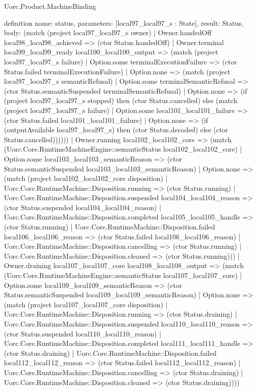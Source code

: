 \begin{lexlean}{Uorc.Product.MachineBinding}
\begin{semanticmodule}
definition{
  name: status,
  parameters: [local97_local97_s : State],
  result: Status,
  body: (match (project local97_local97_s owner)
    | Owner.handedOff local98_local98_achieved => (ctor Status.handedOff)
    | Owner.terminal local99_local99_ready local100_local100_output => (match (project local97_local97_s failure)
      | Option.some terminalExecutionFailure => (ctor Status.failed terminalExecutionFailure)
      | Option.none => (match (project local97_local97_s semanticRefusal)
        | Option.some terminalSemanticRefusal => (ctor Status.semanticSuspended terminalSemanticRefusal)
        | Option.none => (if (project local97_local97_s stopped) then (ctor Status.cancelled) else (match (project local97_local97_s failure)
          | Option.some local101_local101_failure => (ctor Status.failed local101_local101_failure)
          | Option.none => (if (outputAvailable local97_local97_s) then (ctor Status.decoded) else (ctor Status.cancelled))))))
    | Owner.running local102_local102_core => (match (Uorc.Core.RuntimeMachineEngine::semanticStatus local102_local102_core)
      | Option.some local103_local103_semanticReason => (ctor Status.semanticSuspended local103_local103_semanticReason)
      | Option.none => (match (project local102_local102_core disposition)
        | Uorc.Core.RuntimeMachine::Disposition.running => (ctor Status.running)
        | Uorc.Core.RuntimeMachine::Disposition.suspended local104_local104_reason => (ctor Status.suspended local104_local104_reason)
        | Uorc.Core.RuntimeMachine::Disposition.completed local105_local105_handle => (ctor Status.running)
        | Uorc.Core.RuntimeMachine::Disposition.failed local106_local106_reason => (ctor Status.failed local106_local106_reason)
        | Uorc.Core.RuntimeMachine::Disposition.cancelling => (ctor Status.running)
        | Uorc.Core.RuntimeMachine::Disposition.cleaned => (ctor Status.running)))
    | Owner.draining local107_local107_core local108_local108_output => (match (Uorc.Core.RuntimeMachineEngine::semanticStatus local107_local107_core)
      | Option.some local109_local109_semanticReason => (ctor Status.semanticSuspended local109_local109_semanticReason)
      | Option.none => (match (project local107_local107_core disposition)
        | Uorc.Core.RuntimeMachine::Disposition.running => (ctor Status.draining)
        | Uorc.Core.RuntimeMachine::Disposition.suspended local110_local110_reason => (ctor Status.suspended local110_local110_reason)
        | Uorc.Core.RuntimeMachine::Disposition.completed local111_local111_handle => (ctor Status.draining)
        | Uorc.Core.RuntimeMachine::Disposition.failed local112_local112_reason => (ctor Status.failed local112_local112_reason)
        | Uorc.Core.RuntimeMachine::Disposition.cancelling => (ctor Status.draining)
        | Uorc.Core.RuntimeMachine::Disposition.cleaned => (ctor Status.draining))))
}


\end{semanticmodule}
\end{lexlean}
